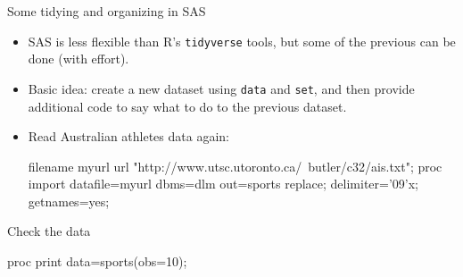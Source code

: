 \documentclass[unknownkeysallowed]{beamer}\usepackage[]{graphicx}\usepackage[]{color}
\begin{document}

\begin{frame}[fragile]{Some tidying and organizing in SAS}
  
  \begin{itemize}
  \item SAS is less flexible than R's \texttt{tidyverse} tools, but
    some of the previous can be done (with effort).
  \item Basic idea: create a new dataset using \texttt{data} and
    \texttt{set}, and then provide additional code to say what to do
    to the previous dataset.
  \item Read Australian athletes data again:
    
    \begin{Datastep}
filename myurl url 
  "http://www.utsc.utoronto.ca/~butler/c32/ais.txt";
proc import 
  datafile=myurl
  dbms=dlm
  out=sports
  replace;
  delimiter='09'x;
  getnames=yes;

    \end{Datastep}
    
  \end{itemize}
  
\end{frame}

\begin{frame}[fragile]{Check the data}
  
  \begin{Sascode}[store=ta]
proc print data=sports(obs=10);    
  \end{Sascode}
  
  
\end{frame}
\end{document}
